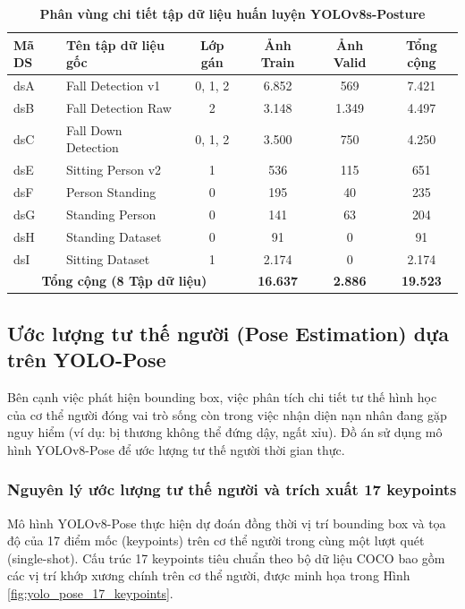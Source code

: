 \begin{table}[H]
    \centering
    \caption[Phân vùng chi tiết tập dữ liệu huấn luyện YOLOv8s-Posture]{\bfseries\fontsize{12pt}{0pt}\selectfont Phân vùng chi tiết tập dữ liệu huấn luyện YOLOv8s-Posture}
    \begin{tabularx}{\textwidth}{|l|X|c|c|c|c|}
    \hline
    \rowcolor{LightCyan}
    \textbf{Mã DS} & \textbf{Tên tập dữ liệu gốc} & \textbf{Lớp gán} & \textbf{Ảnh Train} & \textbf{Ảnh Valid} & \textbf{Tổng cộng} \\ \hline
    dsA & Fall Detection v1 & 0, 1, 2 & 6.852 & 569 & 7.421 \\ \hline
    dsB & Fall Detection Raw & 2 & 3.148 & 1.349 & 4.497 \\ \hline
    dsC & Fall Down Detection & 0, 1, 2 & 3.500 & 750 & 4.250 \\ \hline
    dsE & Sitting Person v2 & 1 & 536 & 115 & 651 \\ \hline
    dsF & Person Standing & 0 & 195 & 40 & 235 \\ \hline
    dsG & Standing Person & 0 & 141 & 63 & 204 \\ \hline
    dsH & Standing Dataset & 0 & 91 & 0 & 91 \\ \hline
    dsI & Sitting Dataset & 1 & 2.174 & 0 & 2.174 \\ \hline
    \multicolumn{3}{|c|}{\textbf{Tổng cộng (8 Tập dữ liệu)}} & \textbf{16.637} & \textbf{2.886} & \textbf{19.523} \\ \hline
    \end{tabularx}
    \label{tab:dataset_posture}
\end{table}

\subsection{Ước lượng tư thế người (Pose Estimation) dựa trên YOLO-Pose}

Bên cạnh việc phát hiện bounding box, việc phân tích chi tiết tư thế hình học của cơ thể người đóng vai trò sống còn trong việc nhận diện nạn nhân đang gặp nguy hiểm (ví dụ: bị thương không thể đứng dậy, ngất xỉu). Đồ án sử dụng mô hình YOLOv8-Pose để ước lượng tư thế người thời gian thực.

\subsubsection{Nguyên lý ước lượng tư thế người và trích xuất 17 keypoints}

Mô hình YOLOv8-Pose thực hiện dự đoán đồng thời vị trí bounding box và tọa độ của 17 điểm mốc (keypoints) trên cơ thể người trong cùng một lượt quét (single-shot). Cấu trúc 17 keypoints tiêu chuẩn theo bộ dữ liệu COCO bao gồm các vị trí khớp xương chính trên cơ thể người, được minh họa trong Hình \ref{fig:yolo_pose_17_keypoints}.

